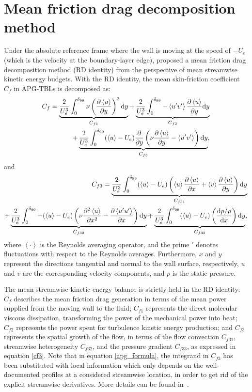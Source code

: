 \section{Mean friction drag decomposition method}\label{theory}
Under the absolute reference frame where the wall is moving at the speed of $-U_e$ (which is the velocity at the boundary-layer edge), \citet{Renard2016} proposed a mean friction drag decomposition method (RD identity) from the perspective of mean streamwise kinetic energy budgets.  With the RD identity, the mean skin-friction coefficient $C_f$ in APG-TBLs is decomposed as:
\begin{align}\label{apg_formula}
C_{f}=\underbrace{\frac{2}{U_e^3}\int_{0}^{\delta_{99}}\nu \left(\frac{\partial \left<u\right>}{\partial y}\right)^2 {\rm d}y}_{C_{f1}}+\underbrace{\frac{2}{U_e^3}\int_{0}^{\delta_{99}}-\left<u'v'\right>\frac{\partial \left<u\right>}{\partial y} {\rm d}y}_{C_{f2}}\nonumber\\
+\underbrace{\frac{2}{U_e^3}\int_{0}^{\delta_{99}}(\left<u\right>-U_e)\frac{\partial}{\partial y}\left(\nu\frac{\partial \left<u\right>}{\partial y}-\left<u'v'\right>\right) {\rm d}y}_{C_{f3}},
\end{align}
and 
\begin{align}\label{cf3}
C_{f3}=
\underbrace{\frac{2}{U_e^3}\int_{0}^{\delta_{99}}(\left<u\right>-U_e)\left(\left<u\right>\frac{\partial\left<u\right>}{\partial x}+\left<v\right>\frac{\partial\left<u\right>}{\partial y}\right) {\rm d}y}_{C_{f31}}\nonumber\\
+\underbrace{\frac{2}{U_e^3}\int_{0}^{\delta_{99}}-(\left<u\right>-U_e)\left(\nu\frac{\partial^2\left<u\right>}{\partial x^2}-\frac{\partial\left<u'u'\right>}{\partial x}\right) {\rm d}y}_{C_{f32}}
+\underbrace{\frac{2}{U_e^3}\int_{0}^{\delta_{99}}(\left<u\right>-U_e)\left(\frac{{\rm d}  p/\rho}{{\rm d}  x}\right) {\rm d}y}_{C_{f33}},
\end{align}
where $\left<\cdot\right>$ is the Reynolds averaging operator, and the prime $'$ denotes fluctuations with respect to the Reynolds averages. Furthermore, $x$ and $y$ represent the directions tangential and normal to the wall surface, respectively, $u$ and $v$ are the corresponding velocity components, and $p$ is the static pressure.


The mean streamwise kinetic energy balance is strictly held in the RD identity:
$C_f$ describes the mean friction drag generation in terms of the mean power supplied from the moving wall to the fluid;
$C_{f1}$ represents the direct molecular viscous dissipation, transforming the power of the mechanical power into heat;
$C_{f2}$ represents the power spent for turbulence kinetic energy production;
and $C_{f3}$ represents the spatial growth of the flow, in terms of the flow convection $C_{f31}$, streamwise heterogeneity $C_{f32}$, and the pressure gradient $C_{f33}$, as expressed in equation \eqref{cf3}. Note that in equation \eqref{apg_formula}, the integrand in $C_{f3}$ has been substituted with local information which only depends on the well-documented profiles at a considered streamwise location, in order to get rid of the explicit streamwise derivatives. More details can be found in~\citet{Renard2016}.



